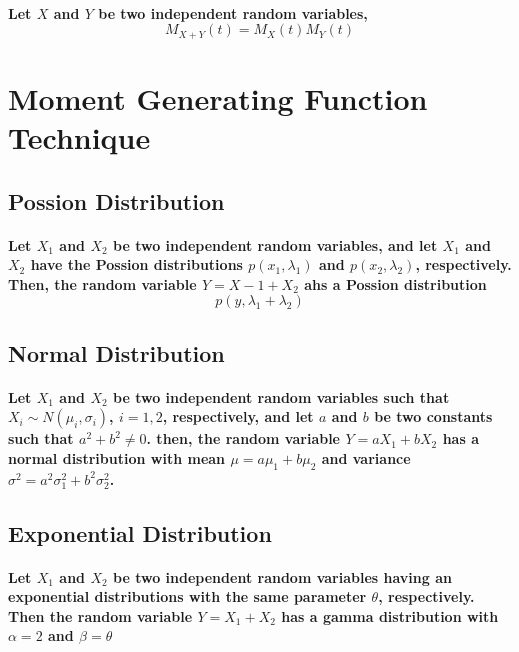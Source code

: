 \documentclass[titlepage]{article}
\begin{document}
            \paragraph{
                Let $X$ and $Y$ be two independent random variables,
                $$M_{X+Y}(t)=M_X(t)M_Y(t)$$
            }
    \section{Moment Generating Function Technique}
        \subsection{Possion Distribution}
            \paragraph{
                Let $X_1$ and $X_2$ be two independent random variables, and let $X_1$ and $X_2$ have the Possion distributions $p(x_1,\lambda_1)$ and $p(x_2,\lambda_2)$, respectively. Then, the random variable $Y=X-1+X_2$ ahs a Possion distribution $$p(y,\lambda_1+\lambda_2)$$
            }
        \subsection{Normal Distribution}
            \paragraph{
                Let $X_1$ and $X_2$ be two independent random variables such that $X_i\sim N(\mu_i,\sigma_i)$, $i=1,2$, respectively, and let $a$ and $b$ be two constants such that $a^2+b^2\neq 0$. then, the random variable $Y=aX_1+bX_2$ has a normal distribution with mean $\mu=a\mu_1+b\mu_2$ and variance $\sigma^2=a^2\sigma_1^2+b^2\sigma_2^2$.
            }
        \subsection{Exponential Distribution}
            \paragraph{
                Let $X_1$ and $X_2$ be two independent random variables having an exponential distributions with the same parameter $\theta$, respectively. Then the random variable $Y=X_1+X_2$ has a gamma distribution with $\alpha=2$ and $\beta=\theta$
            }
\end{document}
